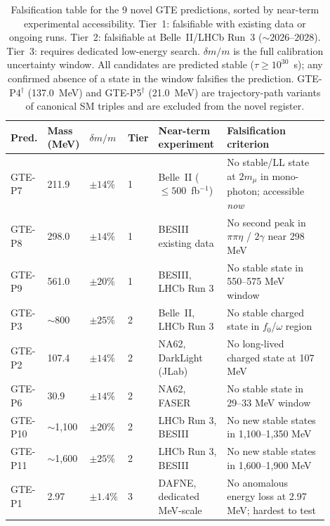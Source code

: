 \documentclass[12pt]{article}
\numberwithin{equation}{section}
\begin{document}
\begin{table}[htbp]
\centering
\footnotesize
\setlength{\tabcolsep}{4pt}
\begin{tabular}{P{0.07\linewidth}P{0.10\linewidth}P{0.08\linewidth}P{0.06\linewidth}P{0.22\linewidth}P{0.37\linewidth}}
\toprule
Pred. & Mass (MeV) & $\delta m/m$ & Tier & Near-term experiment & Falsification criterion \\
\midrule
GTE-P7  & 211.9  & $\pm 14\%$  & 1 & Belle~II ($\leq 500$~fb$^{-1}$) & No stable/LL state at $2m_\mu$ in mono-photon; accessible \emph{now} \\
GTE-P8  & 298.0  & $\pm 14\%$  & 1 & BESIII existing data      & No second peak in $\pi\pi\eta$ / $2\gamma$ near 298 MeV \\
GTE-P9  & 561.0  & $\pm 20\%$  & 1 & BESIII, LHCb Run 3        & No stable state in 550--575 MeV window \\
GTE-P3  & $\sim$800 & $\pm 25\%$ & 2 & Belle~II, LHCb Run 3    & No stable charged state in $f_0$/$\omega$ region \\
GTE-P2  & 107.4  & $\pm 14\%$  & 2 & NA62, DarkLight (JLab)    & No long-lived charged state at 107 MeV \\
GTE-P6  & 30.9   & $\pm 14\%$  & 2 & NA62, FASER              & No stable state in 29--33 MeV window \\
GTE-P10 & $\sim$1,100 & $\pm 20\%$ & 2 & LHCb Run 3, BESIII   & No new stable states in 1,100--1,350 MeV \\
GTE-P11 & $\sim$1,600 & $\pm 25\%$ & 2 & LHCb Run 3, BESIII   & No new stable states in 1,600--1,900 MeV \\
GTE-P1  & 2.97   & $\pm 1.4\%$ & 3 & DAFNE, dedicated MeV-scale & No anomalous energy loss at 2.97 MeV; hardest to test \\
\bottomrule
\end{tabular}
\caption{Falsification table for the 9 novel GTE predictions, sorted by near-term experimental accessibility. Tier~1: falsifiable with existing data or ongoing runs. Tier~2: falsifiable at Belle~II/LHCb Run~3 (${\sim}2026$--$2028$). Tier~3: requires dedicated low-energy search. $\delta m / m$ is the full calibration uncertainty window.  All candidates are predicted stable ($\tau \geq 10^{30}$~s); any confirmed absence of a state in the window falsifies the prediction. GTE-P4$^\dagger$ (137.0~MeV) and GTE-P5$^\dagger$ (21.0~MeV) are trajectory-path variants of canonical SM triples and are excluded from the novel register.}
\label{tab:falsification}
\end{table}
\end{document}

